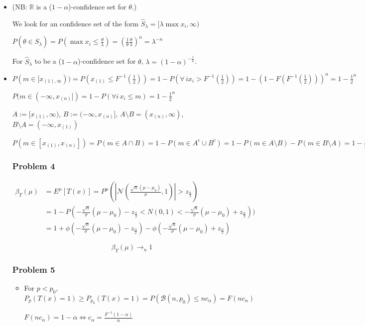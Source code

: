 \documentclass[12pt]{article}
\newcommand{\Q}[1]{\subsubsection*{Problem #1}}
\newcommand{\union}[1]{\underset{#1}{\cup} }
\newcommand{\inter}[1]{\underset{#1}{\cap} }
\begin{document}
\begin{itemize}
\item

(NB: $\mathbb R$ is a ($1-\alpha$)-confidence set for $\theta$.)


We look for an confidence set of the form 
$\hat S_{\lambda} = [\lambda \max x_i, \infty)$


$P(\theta \in \hat S_{\lambda}) = P(\max x_i \le \frac{\theta}{\lambda}) = (\frac 1 {\theta} \frac{\theta}{\lambda})^n = \lambda^{-n}$

For $\hat S_{\lambda}$ to be  a ($1-\alpha$)-confidence set for $\theta$, $\lambda = (1-\alpha)^{-\frac1 n}$.


\item $P(m \in [x_{(1), \infty})) = P(x_{(1)} \leq F^{-1}(\frac 1 2)) = 1 - P(\forall \, i x_i > F^{-1}(\frac 1 2)) = 1 - (1 - F(F^{-1}(\frac 1 2)))^n = 1 - \frac 1 2^n$


$P(m \in (- \infty, x_{(n)}]) = 1 - P(\forall i \, x_i \leq m) = 1 - \frac 1 2^n$

$A := [x_{(1)}, \infty)$, $B := (- \infty, x_{(n)}]$, $A \setminus B = (x_{(n)}, \infty)$, $B \setminus A = (- \infty, x_{(1)}) $


$P(m \in [x_{(1)}, x_{(n)}]) = P(m \in A \inter{} B) = 1 - P(m \in A^c \union{} B^c) = 1 - P(m \in A \setminus B) - P(m \in B \setminus A) = 1 - \frac 1 2^{n-1}$


\Q{4}

\begin{align}
\beta_T(\mu) &= E^{\mu}[T(x)] = P^{\mu}(|\mathcal N(\frac{\sqrt n(\mu - \mu_0)}{\sigma}, 1)| > z_{\frac{\alpha}2})
\\&= 1 - P(-\frac{\sqrt n}{\sigma}(\mu-\mu_0) - z_{\frac{\alpha}2} < N(0, 1) < -\frac{\sqrt n}{\sigma}(\mu-\mu_0) + z_{\frac{\alpha}2}))
\\&=  1 + \phi( - \frac{\sqrt n}{\sigma}(\mu-\mu_0) - z_{\frac{\alpha}2}) - \phi( - \frac{\sqrt n}{\sigma}(\mu-\mu_0) + z_{\frac{\alpha}2})
\end{align}

$$\beta_T(\mu) \rightarrow_n 1$$


\Q{5}

\begin{itemize}
\item For $p < p_0$, $P_p(T(x) = 1) \geq P_{p_0}(T(x) = 1) = P( \mathcal B(n, p_0) \le n c_{\alpha}) = F(n c_{\alpha})$

$ F(n c_{\alpha}) = 1 - \alpha \iff c_{\alpha} = \frac{F^{-1}(1 - \alpha)}{n} $


\end{itemize}
\end{itemize}
\end{document}
